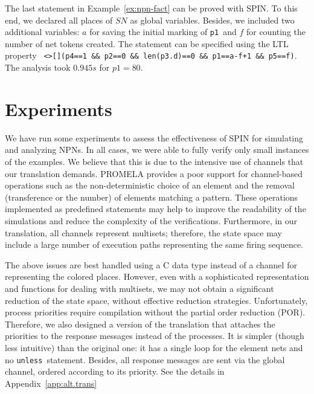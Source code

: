 \documentclass{llncs}
\begin{document}
\begin{example}
The last statement in Example~\ref{ex:npn-fact} can be proved with SPIN. To this end, we declared all places of $SN$ as global variables. Besides, we included two additional variables: $a$ for saving the initial marking of \small\verb"p1"\nfont\ and $f$ for counting the number of net tokens created. The statement can be specified using the LTL property \small\verb" <>[](p4==1 && p2==0 && len(p3.d)==0 && p1==a-f+1 && p5==f)"\nfont. The analysis took $0.945s$ for  $p1=80$.
\end{example}

\section{Experiments}
\label{sec:performance}

We have run some experiments to assess the effectiveness of SPIN for simulating and analyzing NPNs. In all cases, we were able to fully verify only small instances of the examples. We believe that this is due to the intensive use of channels that our translation demands. PROMELA provides a poor support for channel-based operations such as the non-deterministic choice of an element and the removal (transference or the number) of elements matching a pattern. These operations implemented as predefined statements may help to improve the readability of the simulations and reduce the complexity of the verifications. Furthermore, in our translation, all channels represent multisets; therefore, the state space may include a large number of execution paths representing the same firing sequence.

The above issues are best handled using a C data type instead of a channel for representing the colored places. However, even with a sophisticated representation and functions for dealing with multisets, we may not obtain a significant reduction of the state space, without effective reduction strategies. Unfortunately, process priorities require compilation without the partial order reduction (POR). Therefore, we also designed a version of the translation that attaches the priorities to the response messages instead of the processes. It is simpler (though less intuitive) than the original one: it has a single loop for the element nets and no \small\verb"unless"\nfont\  statement. Besides, all response messages are sent via the global channel, ordered according to its priority. See the  details in Appendix~\ref{app:alt.trans}
\end{document}
